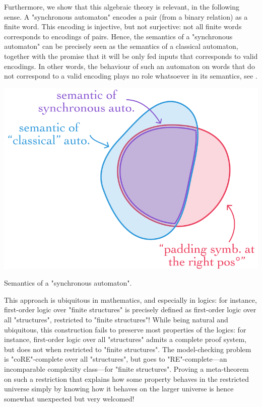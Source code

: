 Furthermore, we show that this algebraic theory is relevant, in the following sense.
A "synchronous automaton" encodes a pair (from a binary relation) as
a finite word. This encoding is injective, but not
surjective: not all finite words corresponds to encodings of pairs.
Hence, the semantics of a "synchronous automaton" can be precisely seen
as the semantics of a classical automaton, together with the promise that it will be only
fed inputs that corresponds to valid encodings. In other words,
the behaviour of such an automaton on words that do not correspond to a valid encoding
plays no role whatsoever in its semantics, see .

\begin{marginfigure}
	\centering
	\includegraphics[width=\linewidth]{fig/intro/projection.png}
	\caption{\AP\label{fig:intro-projection}
		Semantics of a "synchronous automaton".
	}
\end{marginfigure}
This approach is ubiquitous in mathematics, and especially in logics:
for instance, first-order logic over "finite structures" is precisely
defined as first-order logic over all "structures", restricted to "finite structures"!
While being natural and ubiquitous, this construction fails to preserve most properties of the logics:
for instance, first-order logic over all "structures" admits a complete proof system,
but does not when restricted to "finite structures". The model-checking problem
is "coRE"-complete over all "structures", but goes to
"RE"-complete---an incomparable complexity class---for "finite structures".
Proving a meta-theorem on such a restriction that explains how some property
behaves in the restricted universe simply by knowing how it behaves on
the larger universe is hence somewhat unexpected but very welcomed!


